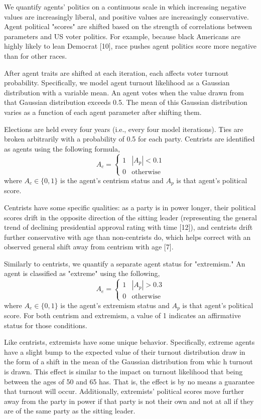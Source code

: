 \documentclass[titlepage, 12pt, leqno]{article} %
\begin{document}
We quantify agents' politics on a continuous scale in which increasing negative
values are increasingly liberal, and positive values are increasingly
conservative. Agent political "scores" are shifted based on the strength of
correlations between parameters and US voter politics. For example, because 
black Americans are highly likely to lean Democrat [10], race pushes agent
politics score more negative than for other races. 

After agent traits are shifted at each iteration, each affects voter turnout
probability. Specifically, we model agent turnout likelihood as a Gaussian
distribution with a variable mean. An agent votes when the value drawn from 
that Gaussian distribution exceeds 0.5. The mean of this Gaussian distribution
varies as a function of each agent parameter after shifting them. 

Elections are held every four years (i.e., every four model iterations). Ties 
are broken arbitrarily with a probability of 0.5 for each party. Centrists are
identified as agents using the following formula,
\[
A_{c} = 
\begin{cases}
    1 & |A_{p}| < 0.1 \\
    0 & \text{otherwise}
\end{cases}
\]
where $A_{c} \in \{0,1\}$ is the agent's centrism status and $A_{p}$ is that
agent's political score. 

Centrists have some specific qualities: as a party is in power longer, their
political scores drift in the opposite direction of the sitting leader
(representing the general trend of declining presidential approval rating with
time [12]), and centrists drift further conservative with age than 
non-centrists do, which helps correct with an observed general shift away from
centrism with age [7].

Similarly to centrists, we quantify a separate agent status for "extremism." 
An agent is classified as "extreme" using the following,
\[
A_{e} =
\begin{cases}
    1 & |A_{p}| > 0.3 \\
    0 & \text{otherwise}
\end{cases}
\]
where $A_{e} \in \{0,1\}$ is the agent's extremism status and $A_{p}$ is that
agent's political score. For both centrism and extremism, a value of 1 indicates
an affirmative status for those conditions.

Like centrists, extremists have some unique behavior. Specifically, extreme
agents have a slight bump to the expected value of their turnout distribution
draw in the form of a shift in the mean of the Gaussian distribution from whic
h turnout is drawn. This effect is similar to the impact on turnout likelihood
that being between the ages of 50 and 65 has. That is, the effect is by no 
means a guarantee that turnout will occur. Additionally, extremists' political
scores move further away from the party in power if that party is not their 
own and not at all if they are of the same party as the sitting leader.
\end{document}
